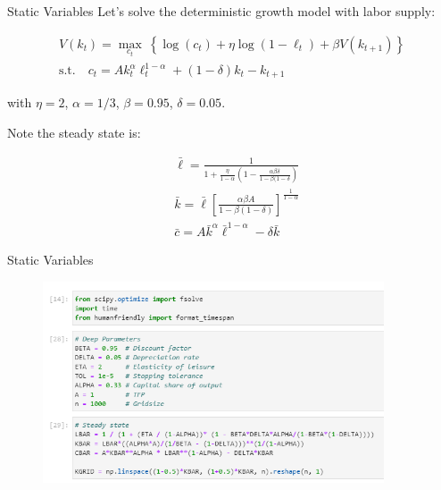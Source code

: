 \documentclass[11pt, xcolor={dvipsnames}, hyperref={colorlinks, allcolors=Blue}]{beamer}
\begin{document}
\begin{frame}{Static Variables}
Let's solve the deterministic growth model with labor supply:

\begin{gather*}
V(k_{t}) = \underset{c_{t}}{\max} \ \left\{\log(c_{t}) + \eta \log (1-\ell_{t}) + \beta V(k_{t+1}) \right\}\\
\text{s.t.} \quad c_{t} = Ak_{t}^{\alpha}\ell_{t}^{1-\alpha} + (1-\delta)k_{t} - k_{t+1}
\end{gather*}
\bigskip

with $\eta = 2$, $\alpha=1/3$, $\beta = 0.95$, $\delta=0.05$.\bigskip

Note the steady state is:

\begin{align*}
&\bar{\ell} = \frac{1}{1 + \frac{\eta}{1-\alpha} ( 1 - \frac{\alpha \beta \delta}{1 - \beta(1 - \delta})}\\
&\bar{k} = \bar{\ell}\left[ \frac{\alpha\beta A}{1 - \beta(1-\delta)}\right]^{\frac{1}{1-\alpha}}\\
&\bar{c} = A\bar{k}^{\alpha}\bar{\ell}^{1-\alpha} - \delta \bar{k}
\end{align*}
\end{frame}

\begin{frame}{Static Variables}

\begin{figure}
	\includegraphics[width=0.9\textwidth]{Code7.png}
	\hfill
\end{figure}

\end{frame}
\end{document}
